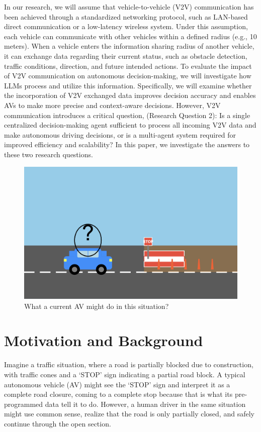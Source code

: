 \documentclass[conference]{IEEEtran}
\begin{document}
In our research, we will assume that vehicle-to-vehicle (V2V) communication has been achieved through a standardized networking protocol, such as LAN-based direct communication or a low-latency wireless system. Under this assumption, each vehicle can communicate with other vehicles within a defined radius (e.g., 10 meters). When a vehicle enters the information sharing radius of another vehicle, it can exchange data regarding their current status, such as obstacle detection, traffic conditions, direction, and future intended actions.
To evaluate the impact of V2V communication on autonomous decision-making, we will investigate how LLMs process and utilize this information. Specifically, we will examine whether the incorporation of V2V exchanged data improves decision accuracy and enables AVs to make more precise and context-aware decisions.
However, V2V communication introduces a critical question, (Research Question 2): Is a single centralized decision-making agent sufficient to process all incoming V2V data and make autonomous driving decisions, or is a multi-agent system required for improved efficiency and scalability? In this paper, we investigate the answers to these two research questions. 


\begin{figure}[!h]
    \centering
    \includegraphics[width= .9\linewidth]{s2.png}
    \caption{What a current AV might do in this situation?}
    \label{fig:enter-label-unique}
\end{figure}
\section{Motivation and Background}

Imagine a traffic situation, where a road is partially blocked due to construction, with traffic cones and a `STOP' sign indicating a partial road block. A typical autonomous vehicle (AV) might see the `STOP' sign and interpret it as a complete road closure, coming to a complete stop because that is what its pre-programmed data tell it to do. However, a human driver in the same situation might use common sense, realize that the road is only partially closed, and safely continue through the open section.
\end{document}

